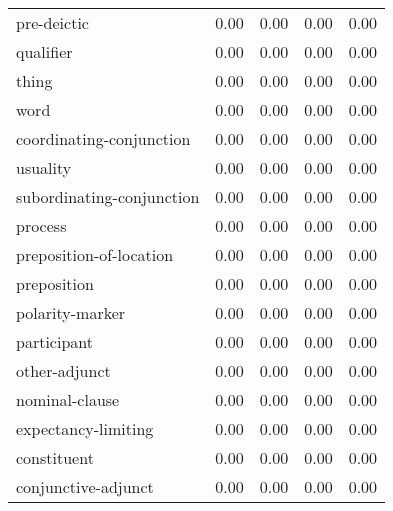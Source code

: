 \begin{table}[!ht]
\begin{tabular}{lrrrr}
pre-deictic               &     0.00 &                        0.00 &                    0.00 &                    0.00 \\
qualifier                 &     0.00 &                        0.00 &                    0.00 &                    0.00 \\
thing                     &     0.00 &                        0.00 &                    0.00 &                    0.00 \\
word                      &     0.00 &                        0.00 &                    0.00 &                    0.00 \\
coordinating-conjunction  &     0.00 &                        0.00 &                    0.00 &                    0.00 \\
usuality                  &     0.00 &                        0.00 &                    0.00 &                    0.00 \\
subordinating-conjunction &     0.00 &                        0.00 &                    0.00 &                    0.00 \\
process                   &     0.00 &                        0.00 &                    0.00 &                    0.00 \\
preposition-of-location   &     0.00 &                        0.00 &                    0.00 &                    0.00 \\
preposition               &     0.00 &                        0.00 &                    0.00 &                    0.00 \\
polarity-marker           &     0.00 &                        0.00 &                    0.00 &                    0.00 \\
participant               &     0.00 &                        0.00 &                    0.00 &                    0.00 \\
other-adjunct             &     0.00 &                        0.00 &                    0.00 &                    0.00 \\
nominal-clause            &     0.00 &                        0.00 &                    0.00 &                    0.00 \\
expectancy-limiting       &     0.00 &                        0.00 &                    0.00 &                    0.00 \\
constituent               &     0.00 &                        0.00 &                    0.00 &                    0.00 \\
conjunctive-adjunct       &     0.00 &                        0.00 &                    0.00 &                    0.00 \\

\end{tabular}
\end{table}
